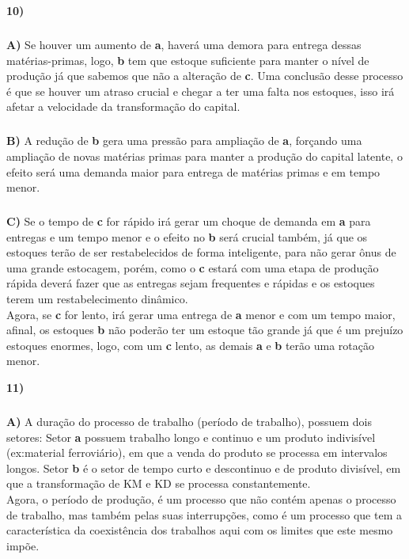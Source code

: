 \documentclass[a4paper, 12pt]{article} %
\begin{document}
\par \textbf{10)} 

\vspace{0.5cm}
\subparagraph{} \textbf{A)} Se houver um aumento de \textbf{a}, haverá uma demora para entrega dessas matérias-primas, logo, \textbf{b} tem que estoque suficiente para manter o nível de produção já que sabemos que não a alteração de \textbf{c}. Uma conclusão desse processo é que se houver um atraso crucial e chegar a ter uma falta nos estoques, isso irá afetar a velocidade da transformação do capital.

\subparagraph{} \textbf{B)} A redução de \textbf{b} gera uma pressão para ampliação de \textbf{a}, forçando uma ampliação de novas matérias primas para manter a produção do capital latente, o efeito será uma demanda maior para entrega de matérias primas e em tempo menor.

\subparagraph{} \textbf{C)} Se o tempo de \textbf{c} for rápido irá gerar um choque de demanda em \textbf{a} para entregas e um tempo menor e o efeito no \textbf{b} será crucial também, já que os estoques terão de ser restabelecidos de forma inteligente, para não gerar ônus de uma grande estocagem, porém, como o \textbf{c} estará com uma etapa de produção rápida deverá fazer que as entregas sejam frequentes e rápidas e os estoques terem um restabelecimento dinâmico.
\\
Agora, se \textbf{c} for lento, irá gerar uma entrega de \textbf{a} menor e com um tempo maior, afinal, os estoques \textbf{b} não poderão ter um estoque tão grande já que é um prejuízo estoques enormes, logo, com um \textbf{c} lento, as demais \textbf{a} e \textbf{b} terão uma rotação menor. 

\vspace{0.5cm}

\par \textbf{11)} 


\subparagraph{} \textbf{A)} A duração do processo de trabalho (período de trabalho), possuem dois setores: Setor \textbf{a} possuem trabalho longo e continuo e um produto indivisível (ex:material ferroviário), em que a venda do produto se processa em intervalos longos. Setor \textbf{b} é o setor de tempo curto e descontinuo e de produto divisível, em que a transformação de KM e KD se processa constantemente.
\\
Agora, o período de produção, é um processo  que não contém apenas o processo de trabalho, mas também pelas suas interrupções, como é um processo que tem a característica da coexistência dos trabalhos aqui com os limites que este mesmo impõe.
\end{document}
